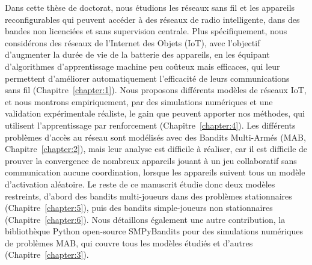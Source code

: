 \begin{resume_fr}




Dans cette thèse de doctorat, nous étudions les réseaux sans fil et les appareils reconfigurables qui peuvent accéder à des réseaux de radio intelligente, dans des bandes non licenciées et sans supervision centrale.
Plus spécifiquement, nous considérons des réseaux de l'Internet des Objets (IoT), avec l'objectif d'augmenter la durée de vie de la batterie des appareils, en les équipant d'algorithmes d'apprentissage machine peu coûteux mais efficaces, qui leur permettent d'améliorer automatiquement l'efficacité de leurs communications sans fil (Chapitre~\ref{chapter:1}).
Nous proposons différents modèles de réseaux IoT, et nous montrons empiriquement, par des simulations numériques et une validation expérimentale réaliste, le gain que peuvent apporter nos méthodes, qui utilisent l'apprentissage par renforcement (Chapitre~\ref{chapter:4}).
Les différents problèmes d'accès au réseau sont modélisés avec des Bandits Multi-Armés (MAB, Chapitre~\ref{chapter:2}), mais leur analyse est difficile à réaliser,
car il est difficile de prouver la convergence de nombreux appareils jouant à un jeu collaboratif sans communication aucune coordination, lorsque les appareils suivent tous un modèle d'activation aléatoire.
Le reste de ce manuscrit étudie donc deux modèles restreints, d'abord des bandits multi-joueurs dans des problèmes stationnaires (Chapitre~\ref{chapter:5}), puis des bandits simple-joueurs non stationnaires (Chapitre~\ref{chapter:6}).
Nous détaillons également une autre contribution, la bibliothèque Python open-source SMPyBandits pour des simulations numériques de problèmes MAB, qui couvre tous les modèles étudiés et d'autres (Chapitre~\ref{chapter:3}).



\end{resume_fr}
